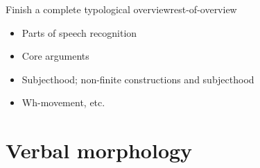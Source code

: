 \documentclass[a4paper, oneside, 12pt]{report}
\begin{document}
\begin{todobox}{Finish a complete typological overview}{rest-of-overview}
    \begin{itemize}
        \item Parts of speech recognition
        \item Core arguments 
        \item Subjecthood; non-finite constructions and subjecthood
        \item Wh-movement, etc.
    \end{itemize}
\end{todobox}

\chapter{Verbal morphology}



\end{document}

